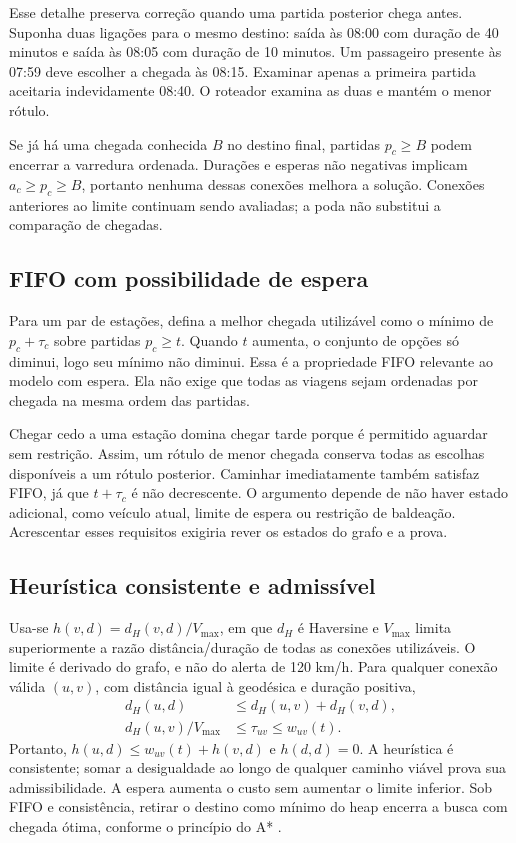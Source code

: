 \documentclass[12pt]{article}
\begin{document}
Esse detalhe preserva correção quando uma partida posterior chega antes. Suponha duas ligações para o mesmo destino: saída às 08:00 com duração de 40 minutos e saída às 08:05 com duração de 10 minutos. Um passageiro presente às 07:59 deve escolher a chegada às 08:15. Examinar apenas a primeira partida aceitaria indevidamente 08:40. O roteador examina as duas e mantém o menor rótulo.

Se já há uma chegada conhecida $B$ no destino final, partidas $p_c\geq B$ podem encerrar a varredura ordenada. Durações e esperas não negativas implicam $a_c\geq p_c\geq B$, portanto nenhuma dessas conexões melhora a solução. Conexões anteriores ao limite continuam sendo avaliadas; a poda não substitui a comparação de chegadas.

\subsection{FIFO com possibilidade de espera}
Para um par de estações, defina a melhor chegada utilizável como o mínimo de $p_c+\tau_c$ sobre partidas $p_c\geq t$. Quando $t$ aumenta, o conjunto de opções só diminui, logo seu mínimo não diminui. Essa é a propriedade FIFO relevante ao modelo com espera. Ela não exige que todas as viagens sejam ordenadas por chegada na mesma ordem das partidas.

Chegar cedo a uma estação domina chegar tarde porque é permitido aguardar sem restrição. Assim, um rótulo de menor chegada conserva todas as escolhas disponíveis a um rótulo posterior. Caminhar imediatamente também satisfaz FIFO, já que $t+\tau_c$ é não decrescente. O argumento depende de não haver estado adicional, como veículo atual, limite de espera ou restrição de baldeação. Acrescentar esses requisitos exigiria rever os estados do grafo e a prova.

\subsection{Heurística consistente e admissível}
Usa-se $h(v,d)=d_H(v,d)/V_{\max}$, em que $d_H$ é Haversine e $V_{\max}$ limita superiormente a razão distância/duração de todas as conexões utilizáveis. O limite é derivado do grafo, e não do alerta de 120 km/h. Para qualquer conexão válida $(u,v)$, com distância igual à geodésica e duração positiva,
\begin{align}
d_H(u,d)&\leq d_H(u,v)+d_H(v,d),\\
d_H(u,v)/V_{\max}&\leq\tau_{uv}\leq w_{uv}(t).
\end{align}
Portanto, $h(u,d)\leq w_{uv}(t)+h(v,d)$ e $h(d,d)=0$. A heurística é consistente; somar a desigualdade ao longo de qualquer caminho viável prova sua admissibilidade. A espera aumenta o custo sem aumentar o limite inferior. Sob FIFO e consistência, retirar o destino como mínimo do heap encerra a busca com chegada ótima, conforme o princípio do A* \cite{hart}.
\end{document}

